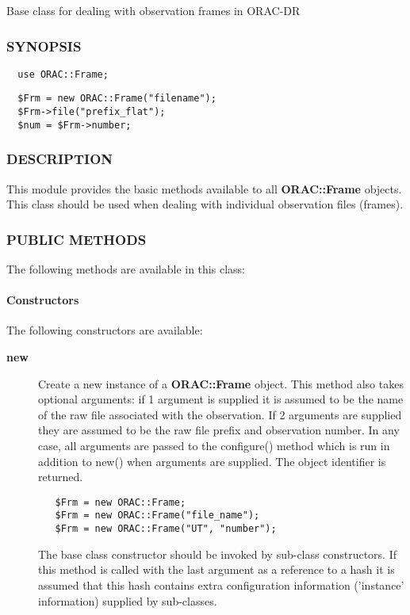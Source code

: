 Base class for dealing with observation frames in ORAC-DR

\subsubsection*{SYNOPSIS\label{ORAC::Frame_SYNOPSIS}}\begin{verbatim}
  use ORAC::Frame;
\end{verbatim}
\begin{verbatim}
  $Frm = new ORAC::Frame("filename");
  $Frm->file("prefix_flat");
  $num = $Frm->number;
\end{verbatim}
\subsubsection*{DESCRIPTION\label{ORAC::Frame_DESCRIPTION}}

This module provides the basic methods available to all \textbf{ORAC::Frame}
objects. This class should be used when dealing with individual
observation files (frames).

\subsubsection*{PUBLIC METHODS\label{ORAC::Frame_PUBLIC_METHODS}}

The following methods are available in this class:

\paragraph*{Constructors\label{ORAC::Frame_Constructors}}

The following constructors are available:

\begin{description}
\item[\textbf{new}] \mbox{}

Create a new instance of a \textbf{ORAC::Frame} object.  This method also
takes optional arguments: if 1 argument is supplied it is assumed to
be the name of the raw file associated with the observation. If 2
arguments are supplied they are assumed to be the raw file prefix and
observation number. In any case, all arguments are passed to the
configure() method which is run in addition to new() when arguments
are supplied.  The object identifier is returned.

\begin{verbatim}
   $Frm = new ORAC::Frame;
   $Frm = new ORAC::Frame("file_name");
   $Frm = new ORAC::Frame("UT", "number");
\end{verbatim}


The base class constructor should be invoked by sub-class constructors.
If this method is called with the last argument as a reference to
a hash it is assumed that this hash contains extra configuration
information ('instance' information) supplied by sub-classes.

\end{description}
